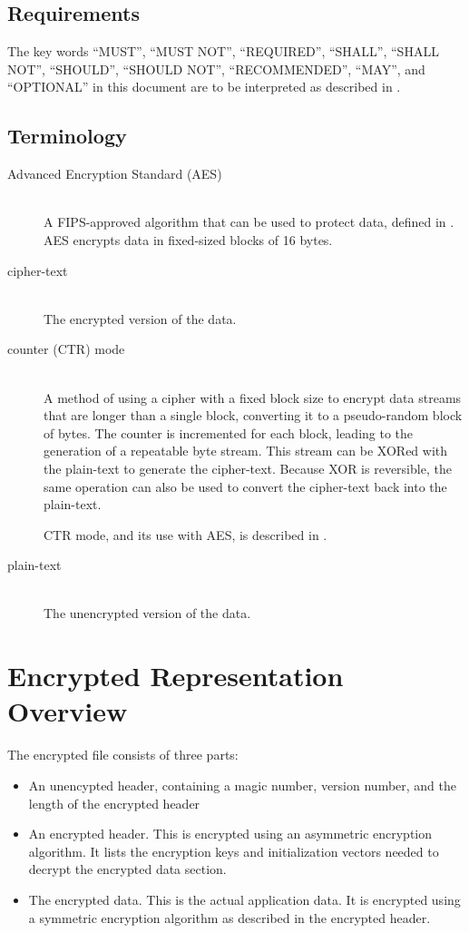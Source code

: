 \documentclass[10pt]{article}
\begin{document}
\subsection{Requirements}
The key words ``MUST'', ``MUST NOT'', ``REQUIRED'', ``SHALL'', ``SHALL NOT'', ``SHOULD'', ``SHOULD NOT'',
``RECOMMENDED'', ``MAY'', and ``OPTIONAL'' in this document are to be interpreted as described in \cite{RFC2119}.

\subsection{Terminology}
\begin{description}
\item[Advanced Encryption Standard (AES)]~\\
A FIPS-approved algorithm that can be used to protect data, defined in
\cite{AESSTD}.
AES encrypts data in fixed-sized blocks of 16 bytes.

\item[cipher-text]~\\
The encrypted version of the data.

\item[counter (CTR) mode]~\\
A method of using a cipher with a fixed block size to encrypt data streams that are longer than a single block,
converting it to a pseudo-random block of bytes.
The counter is  incremented for each block, leading to the generation of a repeatable byte stream.
This stream can be XORed with the plain-text to generate the cipher-text.
Because XOR is reversible, the same operation can also be used to convert the cipher-text back into the plain-text.

CTR mode, and its use with AES, is described in \cite{CTRMODE}.

\item[plain-text]~\\
The unencrypted version of the data.
 
\end{description}

\section{Encrypted Representation Overview}
The encrypted file consists of three parts:

\begin{itemize}
\item An unencypted header, containing a magic number, version number, and the length of the encrypted header

\item An encrypted header.  This is encrypted using an asymmetric encryption algorithm.
It lists the encryption keys and initialization vectors needed to decrypt the encrypted data section.

\item The encrypted data.
This is the actual application data.
It is encrypted using a symmetric encryption algorithm as described in the encrypted header.
\end{itemize}
\end{document}
